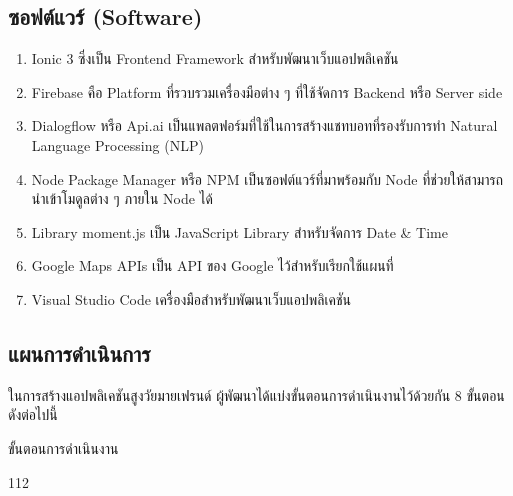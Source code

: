 \subsection{ซอฟต์แวร์ (Software)}
\begin{enumerate}
	\item Ionic 3 ซึ่งเป็น Frontend Framework สำหรับพัฒนาเว็บแอปพลิเคชัน
	\item Firebase คือ Platform ที่รวบรวมเครื่องมือต่าง ๆ ที่ใช้จัดการ Backend หรือ Server side
	\item Dialogflow หรือ Api.ai เป็นแพลตฟอร์มที่ใช้ในการสร้างแชทบอทที่รองรับการทำ Natural Language Processing (NLP)
	\item Node Package Manager หรือ NPM เป็นซอฟต์แวร์ที่มาพร้อมกับ Node ที่ช่วยให้สามารถนำเข้าโมดูลต่าง ๆ ภายใน Node ได้
	\item Library moment.js เป็น JavaScript Library สำหรับจัดการ Date & Time
	\item Google Maps APIs เป็น API ของ Google ไว้สำหรับเรียกใช้แผนที่
	\item Visual Studio Code เครื่องมือสำหรับพัฒนาเว็บแอปพลิเคชัน
\end{enumerate}

\subsection{แผนการดำเนินการ}
	ในการสร้างแอปพลิเคชันสูงวัยมายเฟรนด์ ผู้พัฒนาได้แบ่งขั้นตอนการดำเนินงานไว้ด้วยกัน 8 ขั้นตอน ดังต่อไปนี้

\begin{table}[H]
	\noindent
	\caption{ขั้นตอนการดำเนินงาน}
	\begin{ganttchart}[
		canvas/.append style={fill=none, draw=black!5, line width=.75pt},
		vgrid={*2{draw=black!7, line width=.75pt}},
		title label font=\bfseries\footnotesize,
		bar label node/.append style={
			align=left,
			text width=width("10. Functional Testing On")},
		bar/.append style={draw=none, fill=black!63}
		]{1}{12}
		\\
		 \\
		 \\
		 \\
		 \\
		 \\
		 \\
		 \\
		 \\
		 \\
	\end{ganttchart}
	\label{tab:ganttchart}
\end{table}
